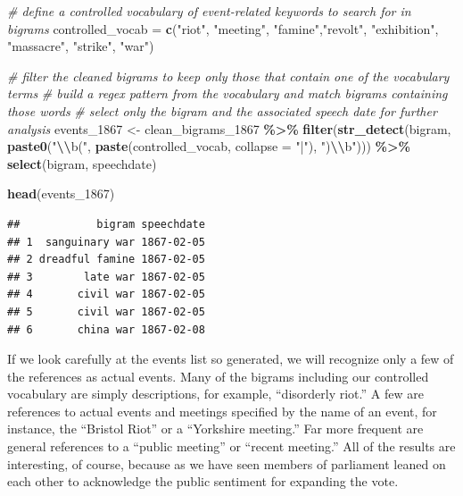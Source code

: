 \documentclass[
]{article}
\newenvironment{Shaded}{\begin{snugshade}}{\end{snugshade}}
\newcommand{\AttributeTok}[1]{\textcolor[rgb]{0.13,0.29,0.53}{#1}}
\newcommand{\CommentTok}[1]{\textcolor[rgb]{0.56,0.35,0.01}{\textit{#1}}}
\newcommand{\FunctionTok}[1]{\textcolor[rgb]{0.13,0.29,0.53}{\textbf{#1}}}
\newcommand{\NormalTok}[1]{#1}
\newcommand{\OtherTok}[1]{\textcolor[rgb]{0.56,0.35,0.01}{#1}}
\newcommand{\SpecialCharTok}[1]{\textcolor[rgb]{0.81,0.36,0.00}{\textbf{#1}}}
\newcommand{\StringTok}[1]{\textcolor[rgb]{0.31,0.60,0.02}{#1}}
\begin{document}
\begin{Shaded}
\begin{Highlighting}[]
\CommentTok{\# define a controlled vocabulary of event{-}related keywords to search for in bigrams}
\NormalTok{controlled\_vocab }\OtherTok{=} \FunctionTok{c}\NormalTok{(}\StringTok{"riot"}\NormalTok{, }\StringTok{"meeting"}\NormalTok{, }\StringTok{"famine"}\NormalTok{,}\StringTok{"revolt"}\NormalTok{, }\StringTok{"exhibition"}\NormalTok{, }\StringTok{"massacre"}\NormalTok{, }
                     \StringTok{"strike"}\NormalTok{, }\StringTok{"war"}\NormalTok{) }

\CommentTok{\# filter the cleaned bigrams to keep only those that contain one of the vocabulary terms}
\CommentTok{\# build a regex pattern from the vocabulary and match bigrams containing those words}
\CommentTok{\# select only the bigram and the associated speech date for further analysis}
\NormalTok{events\_1867 }\OtherTok{\textless{}{-}}\NormalTok{ clean\_bigrams\_1867 }\SpecialCharTok{\%\textgreater{}\%}
  \FunctionTok{filter}\NormalTok{(}\FunctionTok{str\_detect}\NormalTok{(bigram, }
                    \FunctionTok{paste0}\NormalTok{(}\StringTok{"}\SpecialCharTok{\textbackslash{}\textbackslash{}}\StringTok{b("}\NormalTok{, }\FunctionTok{paste}\NormalTok{(controlled\_vocab, }\AttributeTok{collapse =} \StringTok{"|"}\NormalTok{), }\StringTok{")}\SpecialCharTok{\textbackslash{}\textbackslash{}}\StringTok{b"}\NormalTok{))) }\SpecialCharTok{\%\textgreater{}\%} 
  \FunctionTok{select}\NormalTok{(bigram, speechdate) }

\FunctionTok{head}\NormalTok{(events\_1867)}
\end{Highlighting}
\end{Shaded}

\begin{verbatim}
##            bigram speechdate
## 1  sanguinary war 1867-02-05
## 2 dreadful famine 1867-02-05
## 3        late war 1867-02-05
## 4       civil war 1867-02-05
## 5       civil war 1867-02-05
## 6       china war 1867-02-08
\end{verbatim}

If we look carefully at the events list so generated, we will recognize
only a few of the references as actual events. Many of the bigrams
including our controlled vocabulary are simply descriptions, for
example, ``disorderly riot.'' A few are references to actual events and
meetings specified by the name of an event, for instance, the ``Bristol
Riot'' or a ``Yorkshire meeting.'' Far more frequent are general
references to a ``public meeting'' or ``recent meeting.'' All of the
results are interesting, of course, because as we have seen members of
parliament leaned on each other to acknowledge the public sentiment for
expanding the vote.
\end{document}
